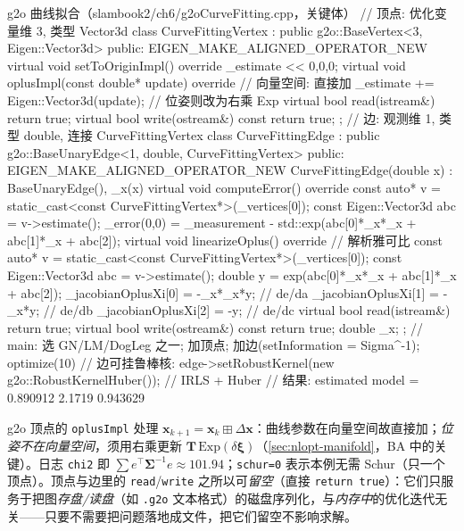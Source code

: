 \begin{codebox}[C++]{g2o 曲线拟合（slambook2/ch6/g2oCurveFitting.cpp，关键体）}
// 顶点: 优化变量维 3, 类型 Vector3d
class CurveFittingVertex : public g2o::BaseVertex<3, Eigen::Vector3d> {
public:
  EIGEN_MAKE_ALIGNED_OPERATOR_NEW
  virtual void setToOriginImpl() override { _estimate << 0,0,0; }
  virtual void oplusImpl(const double* update) override {     // 向量空间: 直接加
    _estimate += Eigen::Vector3d(update);                     // 位姿则改为右乘 Exp
  }
  virtual bool read(istream&) { return true; }
  virtual bool write(ostream&) const { return true; }
};
// 边: 观测维 1, 类型 double, 连接 CurveFittingVertex
class CurveFittingEdge : public g2o::BaseUnaryEdge<1, double, CurveFittingVertex> {
public:
  EIGEN_MAKE_ALIGNED_OPERATOR_NEW
  CurveFittingEdge(double x) : BaseUnaryEdge(), _x(x) {}
  virtual void computeError() override {
    const auto* v = static_cast<const CurveFittingVertex*>(_vertices[0]);
    const Eigen::Vector3d abc = v->estimate();
    _error(0,0) = _measurement - std::exp(abc[0]*_x*_x + abc[1]*_x + abc[2]);
  }
  virtual void linearizeOplus() override {                    // 解析雅可比
    const auto* v = static_cast<const CurveFittingVertex*>(_vertices[0]);
    const Eigen::Vector3d abc = v->estimate();
    double y = exp(abc[0]*_x*_x + abc[1]*_x + abc[2]);
    _jacobianOplusXi[0] = -_x*_x*y;   // de/da
    _jacobianOplusXi[1] = -_x*y;      // de/db
    _jacobianOplusXi[2] = -y;         // de/dc
  }
  virtual bool read(istream&) { return true; }
  virtual bool write(ostream&) const { return true; }
  double _x;
};
// main: 选 GN/LM/DogLeg 之一; 加顶点; 加边(setInformation = Sigma^-1); optimize(10)
// 边可挂鲁棒核: edge->setRobustKernel(new g2o::RobustKernelHuber());  // IRLS + Huber
// 结果: estimated model = 0.890912 2.1719 0.943629
\end{codebox}

\noindent g2o 顶点的 \texttt{oplusImpl} 处理 $\mathbf{x}_{k+1}=\mathbf{x}_k\boxplus\Delta\mathbf{x}$：曲线参数在向量空间故直接加；\emph{位姿不在向量空间}，须用右乘更新 $\mathbf{T}\,\mathrm{Exp}(\delta\boldsymbol{\xi})$（\cref{sec:nlopt-manifold}，BA 中的关键）。日志 \texttt{chi2} 即 $\sum e^\top\boldsymbol{\Sigma}^{-1}e\approx101.94$；\texttt{schur=0} 表示本例无需 Schur（只一个顶点）。顶点与边里的 \texttt{read}/\texttt{write} 之所以可\emph{留空}（直接 \texttt{return true}）：它们只服务于把图\emph{存盘/读盘}（如 \texttt{.g2o} 文本格式）的磁盘序列化，与\emph{内存中}的优化迭代无关——只要不需要把问题落地成文件，把它们留空不影响求解\cite{gaoxiang2019slam14}。

